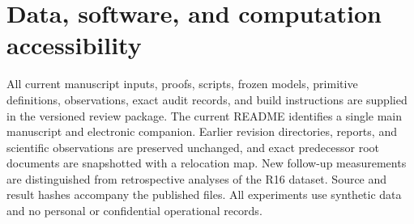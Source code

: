 \documentclass[11pt,letterpaper]{article}
\theoremstyle{definition}
\newcommand{\1}{\mathbf 1}
\begin{document}
\section*{Data, software, and computation accessibility}
All current manuscript inputs, proofs, scripts, frozen models, primitive definitions, observations, exact audit records, and build instructions are supplied in the versioned review package. The current README identifies a single main manuscript and electronic companion. Earlier revision directories, reports, and scientific observations are preserved unchanged, and exact predecessor root documents are snapshotted with a relocation map. New follow-up measurements are distinguished from retrospective analyses of the R16 dataset. Source and result hashes accompany the published files. All experiments use synthetic data and no personal or confidential operational records.
\clearpage\label{r19-reference-start}
\end{document}
